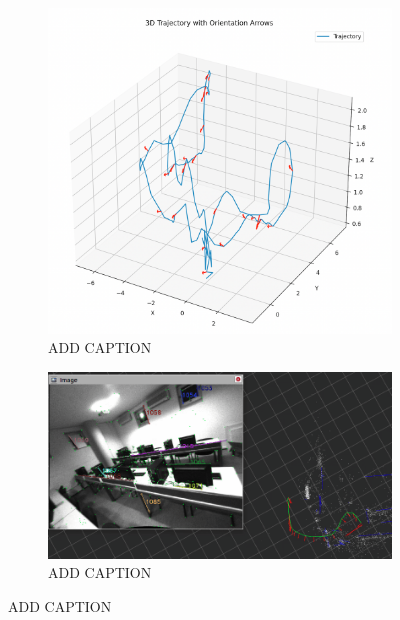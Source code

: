 \documentclass{article}
\begin{document}
\begin{figure}[htbp]
    \centering
    \begin{subfigure}[b]{0.45\textwidth}
      \centering
      \includegraphics[width=\linewidth]{./images/airvo1.png}
      \caption{ADD CAPTION}
      \label{fig:airvo1}
    \end{subfigure}
    \hfill
    \begin{subfigure}[b]{0.45\textwidth}
      \centering
      \includegraphics[width=\linewidth]{./images/airvo2.png}
      \caption{ADD CAPTION}
      \label{fig:airvo2}
    \end{subfigure}
    \caption{ADD CAPTION}
    \label{fig:airvo}
  \end{figure}
\end{document}
